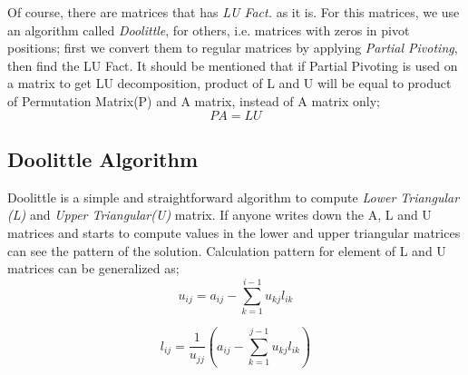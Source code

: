 \documentclass{article}
\begin{document}
Of course, there are matrices that has \textit{LU Fact.} as it is. For this matrices, we use an algorithm called \textit{Doolittle}, for others, i.e. matrices with zeros in pivot positions; first we convert them to regular matrices by applying \textit{Partial Pivoting}, then find the LU Fact. It should be mentioned that if Partial Pivoting is used on a matrix to get LU decomposition, product of L and U will be equal to product of Permutation Matrix(P) and A matrix, instead of A matrix only;
\begin{equation}
  PA = LU
\end{equation}

\subsection{Doolittle Algorithm}
	Doolittle is a simple and straightforward algorithm to compute \textit{Lower Triangular (L)} and \textit{Upper Triangular(U)} matrix. If anyone writes down the A, L and U matrices and starts to compute values in the lower and upper triangular matrices can see the pattern of the solution. Calculation pattern for element of L and U matrices can be generalized as; 
	\begin{equation}
	u_{ij} = a_{ij} - \sum_{k=1}^{i-1}u_{kj}l_{ik}
	\end{equation}
	
	\begin{equation} 
	l_{ij} = \frac{1}{u_{jj}}\left(a_{ij} - \sum_{k=1}^{j-1}u_{kj}l_{ik}\right)
	\end{equation}
\end{document}
